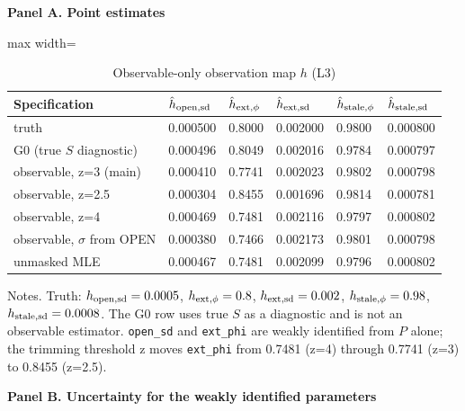 \begin{table}[!htbp]
\centering
\scriptsize
\caption{Observable-only observation map $h$ (L3)}
\label{tab:5}
\vspace{0.5em}
\par\textbf{Panel A. Point estimates}
\vspace{0.1em}

\begin{adjustbox}{max width=\linewidth}
\begin{tabular}{@{}llllll@{}}
\toprule
Specification & $\hat h_{\rm open,sd}$ & $\hat h_{\rm ext,\phi}$ & $\hat h_{\rm ext,sd}$ & $\hat h_{\rm stale,\phi}$ & $\hat h_{\rm stale,sd}$ \\
\midrule
truth & 0.000500 & 0.8000 & 0.002000 & 0.9800 & 0.000800 \\
G0 (true $S$ diagnostic) & 0.000496 & 0.8049 & 0.002016 & 0.9784 & 0.000797 \\
observable, z=3 (main) & 0.000410 & 0.7741 & 0.002023 & 0.9802 & 0.000798 \\
observable, z=2.5 & 0.000304 & 0.8455 & 0.001696 & 0.9814 & 0.000781 \\
observable, z=4 & 0.000469 & 0.7481 & 0.002116 & 0.9797 & 0.000802 \\
observable, $\sigma$ from OPEN & 0.000380 & 0.7466 & 0.002173 & 0.9801 & 0.000798 \\
unmasked MLE & 0.000467 & 0.7481 & 0.002099 & 0.9796 & 0.000802 \\
\bottomrule
\end{tabular}
\end{adjustbox}
\vspace{0.5em}
\par\noindent\begin{minipage}{\linewidth}\raggedright{\scriptsize Notes. Truth: $h_{\rm open,sd}=0.0005$, $h_{\rm ext,\phi}=0.8$, $h_{\rm ext,sd}=0.002$, $h_{\rm stale,\phi}=0.98$, $h_{\rm stale,sd}=0.0008$. The G0 row uses true $S$ as a diagnostic and is not an observable estimator. \texttt{open\_sd} and \texttt{ext\_phi} are weakly identified from $P$ alone; the trimming threshold z moves \texttt{ext\_phi} from 0.7481 (z=4) through 0.7741 (z=3) to 0.8455 (z=2.5).}\end{minipage}\par

\vspace{0.4em}
\par\textbf{Panel B. Uncertainty for the weakly identified parameters}
\vspace{0.1em}


\end{table}
